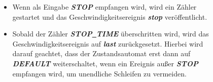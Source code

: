\begin{figure}[h]
\begin{minipage}[t]{10cm}
\begin{itemize}
			\item Wenn als Eingabe \textbf{\textit{STOP}} empfangen wird, wird ein Z\"ahler gestartet und das Geschwindigkeitsereignis \textbf{\textit{stop}} ver\"offentlicht.
			
			\item Sobald der Z\"ahler \textbf{\textit{STOP\underline{\ }TIME}} \"uberschritten wird, wird das Geschwindigkeitsereignis auf \textbf{\textit{last}} zur\"uckgesetzt. Hierbei wird darauf geachtet, dass der Zustandsautomat erst dann auf \textbf{\textit{DEFAULT}} weiterschaltet, wenn ein Ereignis au\ss{}er \textbf{\textit{STOP}} empfangen wird, um unendliche Schleifen zu vermeiden.
		\end{itemize}
	\end{minipage}
\end{figure}


